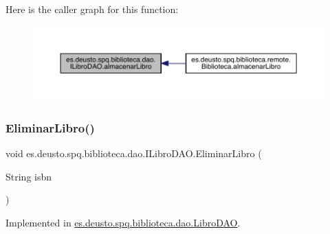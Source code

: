 Here is the caller graph for this function\+:
\nopagebreak
\begin{figure}[H]
\begin{center}
\leavevmode
\includegraphics[width=350pt]{interfacees_1_1deusto_1_1spq_1_1biblioteca_1_1dao_1_1_i_libro_d_a_o_ad8e76a77aa5fc0900142921d7efb79f0_icgraph}
\end{center}
\end{figure}
\mbox{\label{interfacees_1_1deusto_1_1spq_1_1biblioteca_1_1dao_1_1_i_libro_d_a_o_afb545c6295192e9cde403bf72dbc5818}} 
\subsubsection{\texorpdfstring{Eliminar\+Libro()}{EliminarLibro()}}
{\footnotesize\ttfamily void es.\+deusto.\+spq.\+biblioteca.\+dao.\+I\+Libro\+D\+A\+O.\+Eliminar\+Libro (\begin{DoxyParamCaption}\item[{String}]{isbn }\end{DoxyParamCaption})}



Implemented in \mbox{\hyperlink{classes_1_1deusto_1_1spq_1_1biblioteca_1_1dao_1_1_libro_d_a_o_a9c3cfc8c276f20d51bef2af2b204a84a}{es.\+deusto.\+spq.\+biblioteca.\+dao.\+Libro\+D\+AO}}.

